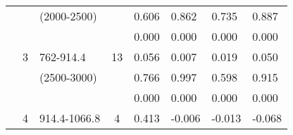 \begin{table}[p]
\begin{tabular}{cclcllll}
                                                               &                                                                 & (2000-2500)                                                           &                                                                        &  0.606                                     & 0.862                                            & 0.735                                               & 0.887  \\ 
                                                               &                                                                 &                                                                                &                                                                        & 0.000                                      & 0.000                                            & 0.000                                               & 0.000  \\ \cline{5-8}\noalign{\smallskip}
                                                               & 3                                                              & 762-914.4                                                              & 13                                                                   &  0.056                                     & 0.007                                            & 0.019                                               & 0.050  \\ 
                                                               &                                                                 & (2500-3000)                                                           &                                                                        & 0.766                                      & 0.997                                            & 0.598                                               & 0.915  \\ 
                                                               &                                                                 &                                                                                &                                                                        & 0.000                                      & 0.000                                            & 0.000                                               & 0.000  \\ \cline{5-8}\noalign{\smallskip}
                                                               & 4                                                              & 914.4-1066.8                                                         & 4                                                                     & 0.413                                      & -0.006                                           & -0.013                                              & -0.068  \\   

\end{tabular}
\end{table}
